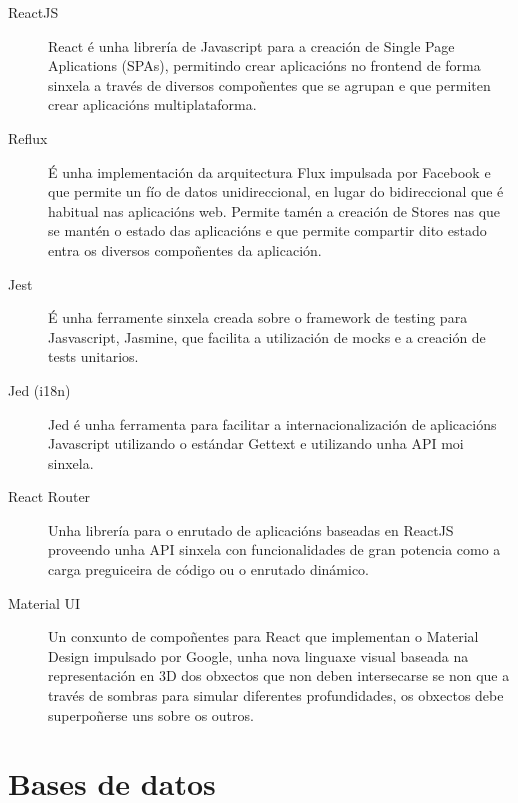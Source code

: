   \begin{description}
   \item [ReactJS] React é unha librería de Javascript para a creación de Single Page 
Aplications (SPAs), permitindo crear aplicacións no frontend de forma sinxela a través de 
diversos compoñentes que se agrupan e que permiten crear aplicacións multiplataforma.
   
   \item [Reflux] É unha implementación da arquitectura Flux impulsada por Facebook e que 
permite un fío de datos unidireccional, en lugar do bidireccional que é habitual nas 
aplicacións web.
    Permite tamén a creación de Stores nas que se mantén o estado das aplicacións e que 
permite compartir dito estado entra os diversos compoñentes da aplicación.
   
   \item [Jest] É unha ferramente sinxela creada sobre o framework de testing 
para Jasvascript, Jasmine, que facilita a utilización de mocks e a creación de 
tests unitarios.

   \item [Jed (i18n)] Jed é unha ferramenta para facilitar a internacionalización de 
aplicacións Javascript utilizando o estándar Gettext e utilizando unha API moi sinxela.
   
   \item [React Router] Unha librería para o enrutado de aplicacións baseadas en ReactJS 
proveendo unha API sinxela con funcionalidades de gran potencia como a carga preguiceira 
de código ou o enrutado dinámico.
   
   \item [Material UI] Un conxunto de compoñentes para React que implementan o Material 
Design impulsado por Google, unha nova linguaxe visual baseada na representación en 3D 
dos obxectos que non deben intersecarse se non que a través de sombras para simular 
diferentes profundidades, os obxectos debe superpoñerse uns sobre os outros.
   
  \end{description}

  \section{Bases de datos}

